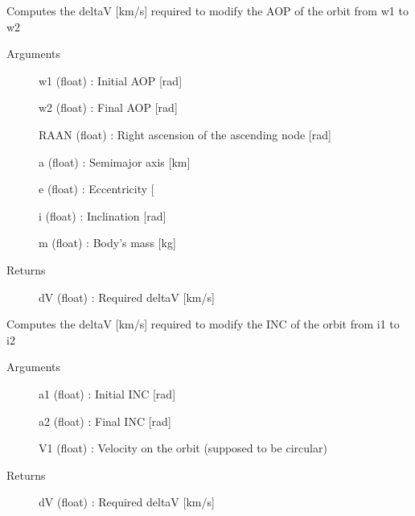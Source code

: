 \documentclass[letterpaper,10pt,english]{sphinxmanual}
\begin{document}
\begin{fulllineitems}
\label{\detokenize{regroupement/dV_computations:regroupement.dV_computations.maneuvers_dV.AOP_dV}}
Computes the delta\sphinxhyphen{}V {[}km/s{]} required to modify the AOP of the orbit from w1 to w2
\begin{description}
\item[{Arguments}] \leavevmode{[}{]}
w1 (float) : Initial AOP {[}rad{]}

w2 (float) : Final AOP {[}rad{]}

RAAN (float) : Right ascension of the ascending node {[}rad{]}

a (float) : Semi\sphinxhyphen{}major axis {[}km{]}

e (float) : Eccentricity {[}\sphinxhyphen{}{]}

i (float) : Inclination {[}rad{]}

m (float) : Body’s mass {[}kg{]}

\item[{Returns}] \leavevmode{[}{]}
dV (float) : Required delta\sphinxhyphen{}V {[}km/s{]}

\end{description}

\end{fulllineitems}


\begin{fulllineitems}
\label{\detokenize{regroupement/dV_computations:regroupement.dV_computations.maneuvers_dV.INC_dV}}
Computes the delta\sphinxhyphen{}V {[}km/s{]} required to modify the INC of the orbit from i1 to i2
\begin{description}
\item[{Arguments}] \leavevmode{[}{]}
a1 (float) : Initial INC {[}rad{]}

a2 (float) : Final INC {[}rad{]}

V1 (float) : Velocity on the orbit (supposed to be circular)

\item[{Returns}] \leavevmode{[}{]}
dV (float) : Required delta\sphinxhyphen{}V {[}km/s{]}

\end{description}

\end{fulllineitems}
\end{document}
